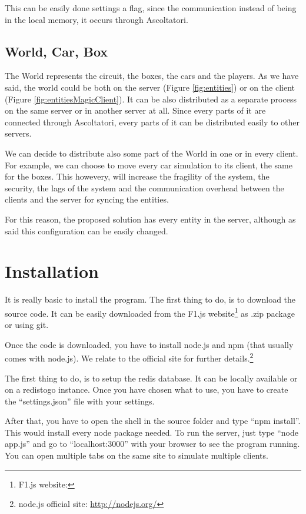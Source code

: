 This can be easily done settings a flag, since the communication instead of being in the local memory, it occurs through Ascoltatori.

\subsection{World, Car, Box}

The World represents the circuit, the boxes, the cars and the players. As we have said, the world could be both on the server (Figure \ref{fig:entities}) or on the client (Figure \ref{fig:entitiesMagicClient}). It can be also distributed as a separate process on the same server or in another server at all. Since every parts of it are connected through Ascoltatori, every parts of it can be distributed easily to other servers.

We can decide to distribute also some part of the World in one or in every client. For example, we can choose to move every car simulation to its client, the same for the boxes. This howevery, will increase the fragility of the system, the security, the lags of the system and the communication overhead between the clients and the server for  syncing the entities.

For this reason, the proposed solution has every entity in the server, although as said this configuration can be easily changed.

\appendix
\section{Installation}

It is really basic to install the program. The first thing to do, is to download the source code. It can be easily downloaded from the F1.js website\footnote{F1.js website: \PROJECTurl} as .zip package or using git.

Once the code is downloaded, you have to install node.js and npm (that usually comes with node.js). We relate to the official site for further details.\footnote{node.js official site: \url{http://nodejs.org/}}

The first thing to do, is to setup the redis database. It can be locally available or on a redistogo instance. Once you have chosen what to use, you have to create the ``settings.json'' file with your settings.

After that, you have to open the shell in the source folder and type ``npm install''. This would install every node package needed. To run the server, just type ``node app.js'' and go to ``localhost:3000'' with your browser to see the program running. You can open multiple tabs on the same site to simulate multiple clients.


